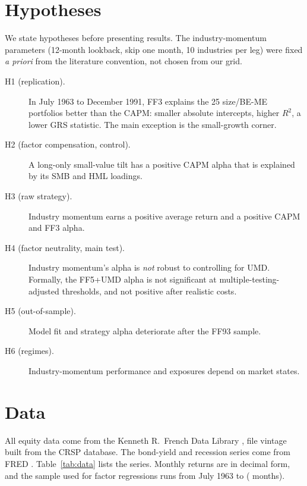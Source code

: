 \documentclass[11pt]{article}
\begin{document}
\section{Hypotheses}

We state hypotheses before presenting results. The industry-momentum parameters (12-month lookback, skip one month, 10 industries per leg) were fixed \emph{a priori} from the literature convention, not chosen from our grid.
\begin{description}
  \item[H1 (replication).] In July 1963 to December 1991, FF3 explains the 25 size/BE-ME portfolios better than the CAPM: smaller absolute intercepts, higher $R^2$, a lower GRS statistic. The main exception is the small-growth corner.
  \item[H2 (factor compensation, control).] A long-only small-value tilt has a positive CAPM alpha that is explained by its SMB and HML loadings.
  \item[H3 (raw strategy).] Industry momentum earns a positive average return and a positive CAPM and FF3 alpha.
  \item[H4 (factor neutrality, main test).] Industry momentum's alpha is \emph{not} robust to controlling for UMD. Formally, the FF5+UMD alpha is not significant at multiple-testing-adjusted thresholds, and not positive after realistic costs.
  \item[H5 (out-of-sample).] Model fit and strategy alpha deteriorate after the FF93 sample.
  \item[H6 (regimes).] Industry-momentum performance and exposures depend on market states.
\end{description}

\section{Data}

All equity data come from the Kenneth R.\ French Data Library \citep{FrenchLibrary}, file vintage built from the \Vintage{} CRSP database. The bond-yield and recession series come from FRED \citep{FRED}. Table~\ref{tab:data} lists the series. Monthly returns are in decimal form, and the sample used for factor regressions runs from July 1963 to \EndSample{} (\NFull{} months).
\end{document}
